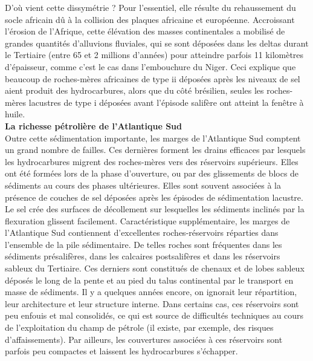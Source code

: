 \documentclass[8pt]{article}
\begin{document}
D'où vient cette dissymétrie ? Pour l'essentiel, elle résulte du rehaussement du socle africain dû à la collision des plaques africaine et européenne. Accroissant l'érosion de l'Afrique, cette élévation des masses continentales a mobilisé de grandes quantités d'alluvions fluviales, qui se sont déposées dans les deltas durant le Tertiaire (entre 65 et 2 millions d'années) pour atteindre parfois 11 kilomètres d'épaisseur, comme c'est le cas dans l'embouchure du Niger. Ceci explique que beaucoup de roches-mères africaines de type ii déposées après les niveaux de sel aient produit des hydrocarbures, alors que du côté brésilien, seules les roches-mères lacustres de type i déposées avant l'épisode salifère ont atteint la fenêtre à huile.\\

\textbf{La richesse pétrolière de l'Atlantique Sud}\\

Outre cette sédimentation importante, les marges de l'Atlantique Sud comptent un grand nombre de failles. Ces dernières forment les drains efficaces par lesquels les hydrocarbures migrent des roches-mères vers des réservoirs supérieurs. Elles ont été formées lors de la phase d'ouverture, ou par des glissements de blocs de sédiments au cours des phases ultérieures. Elles sont souvent associées à la présence de couches de sel déposées après les épisodes de sédimentation lacustre. Le sel crée des surfaces de décollement sur lesquelles les sédiments inclinés par la flexuration glissent facilement. Caractéristique supplémentaire, les marges de l'Atlantique Sud contiennent d'excellentes roches-réservoirs réparties dans l'ensemble de la pile sédimentaire. De telles roches sont fréquentes dans les sédiments présalifères, dans les calcaires postsalifères et dans les réservoirs sableux du Tertiaire. Ces derniers sont constitués de chenaux et de lobes sableux déposés le long de la pente et au pied du talus continental par le transport en masse de sédiments. Il y a quelques années encore, on ignorait leur répartition, leur architecture et leur structure interne. Dans certains cas, ces réservoirs sont peu enfouis et mal consolidés, ce qui est source de difficultés techniques au cours de l'exploitation du champ de pétrole (il existe, par exemple, des risques d'affaissements). Par ailleurs, les couvertures associées à ces réservoirs sont parfois peu compactes et laissent les hydrocarbures s'échapper.\\
\end{document}
